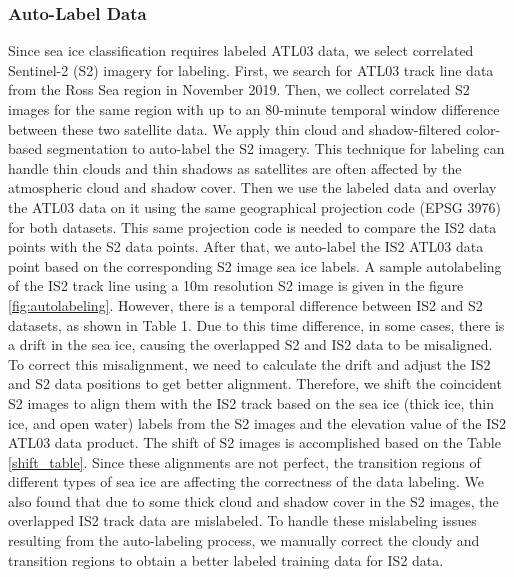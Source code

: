 \subsubsection{Auto-Label Data}
Since sea ice classification requires labeled ATL03 data, we select correlated Sentinel-2 (S2) imagery for labeling. First, we search for ATL03 track line data from the Ross Sea region in November 2019. Then, we collect correlated S2 images for the same region with up to an 80-minute temporal window difference between these two satellite data. We apply thin cloud and shadow-filtered color-based segmentation \cite{iqrah2023toward} to auto-label the S2 imagery. This technique for labeling can handle thin clouds and thin shadows as satellites are often affected by the atmospheric cloud and shadow cover. Then we use the labeled data and overlay the ATL03 data on it using the same geographical projection code (EPSG 3976) for both datasets. This same projection code is needed to compare the IS2 data points with the S2 data points. After that, we auto-label the IS2 ATL03 data point based on the corresponding S2 image sea ice labels. A sample autolabeling of the IS2 track line using a 10m resolution S2 image is given in the figure \ref{fig:autolabeling}. 
%
%
However, there is a temporal difference between IS2 and S2 datasets, as shown in Table 1. Due to this time difference, in some cases, there is a drift in the sea ice, causing the overlapped S2 and IS2 data to be misaligned. To correct this misalignment, we need to calculate the drift and adjust the IS2 and S2 data positions to get better alignment. Therefore, we shift the coincident S2 images to align them with the IS2 track based on the sea ice (thick ice, thin ice, and open water) labels from the S2 images and the elevation value of the IS2 ATL03 data product. The shift of S2 images is accomplished based on the Table \ref{shift_table}. Since these alignments are not perfect, the transition regions of different types of sea ice are affecting the correctness of the data labeling. We also found that due to some thick cloud and shadow cover in the S2 images, the overlapped IS2 track data are mislabeled. To handle these mislabeling issues resulting from the auto-labeling process, we manually correct the cloudy and transition regions to obtain a better labeled training data for IS2 data.

